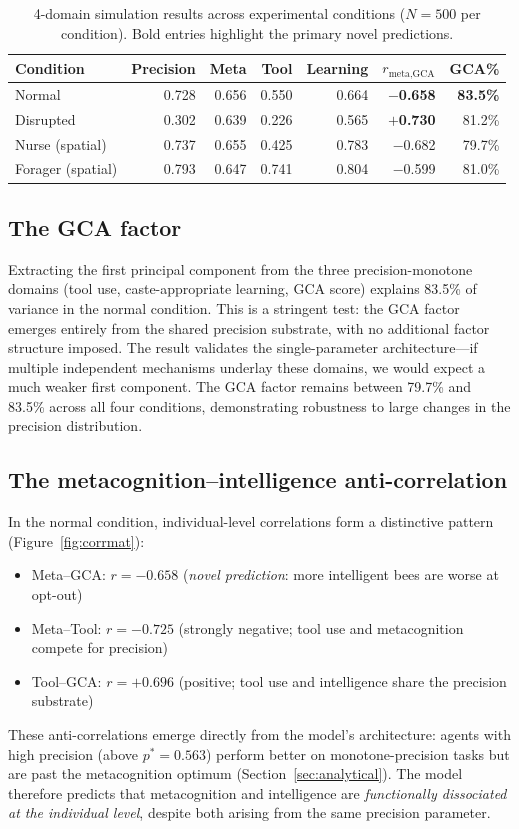 \documentclass[12pt]{article}
\newcommand{\pstar}{p^*}
\begin{document}
\begin{table}[h!]
  \centering
  \caption{4-domain simulation results across experimental conditions ($N=500$ per condition).
  Bold entries highlight the primary novel predictions.}
  \label{tab:results}
  \begin{tabular}{lrrrrrr}
    \toprule
    Condition & Precision & Meta & Tool & Learning & $r_{\text{meta,GCA}}$ & GCA\% \\
    \midrule
    Normal           & 0.728 & 0.656 & 0.550 & 0.664 & \textbf{$-$0.658} & \textbf{83.5\%} \\
    Disrupted        & 0.302 & 0.639 & 0.226 & 0.565 & \textbf{$+$0.730} & 81.2\% \\
    Nurse (spatial)  & 0.737 & 0.655 & 0.425 & 0.783 & $-$0.682 & 79.7\% \\
    Forager (spatial)& 0.793 & 0.647 & 0.741 & 0.804 & $-$0.599 & 81.0\% \\
    \bottomrule
  \end{tabular}
\end{table}

\subsection*{The GCA factor}

Extracting the first principal component from the three precision-monotone domains (tool use,
caste-appropriate learning, GCA score) explains 83.5\% of variance in the normal condition. This
is a stringent test: the GCA factor emerges entirely from the shared precision substrate, with no
additional factor structure imposed. The result validates the single-parameter architecture---if
multiple independent mechanisms underlay these domains, we would expect a much weaker first
component. The GCA factor remains between 79.7\% and 83.5\% across all four conditions,
demonstrating robustness to large changes in the precision distribution.

\subsection*{The metacognition--intelligence anti-correlation}

In the normal condition, individual-level correlations form a distinctive pattern (Figure~\ref{fig:corrmat}):
\begin{itemize}
  \item Meta--GCA: $r = -0.658$ (\emph{novel prediction}: more intelligent bees are worse at opt-out)
  \item Meta--Tool: $r = -0.725$ (strongly negative; tool use and metacognition compete for precision)
  \item Tool--GCA: $r = +0.696$ (positive; tool use and intelligence share the precision substrate)
\end{itemize}
These anti-correlations emerge directly from the model's architecture: agents with high precision
(above $\pstar = 0.563$) perform better on monotone-precision tasks but are past the metacognition
optimum (Section~\ref{sec:analytical}). The model therefore predicts that metacognition and
intelligence are \emph{functionally dissociated at the individual level}, despite both arising from
the same precision parameter.
\end{document}
